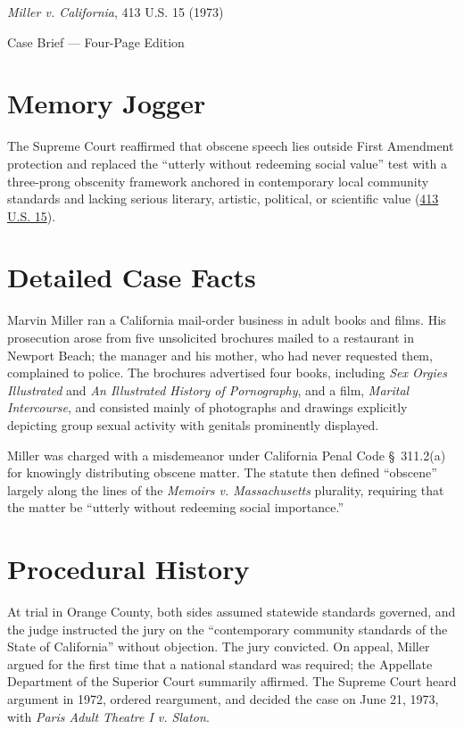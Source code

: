 \documentclass[12pt]{article}
\begin{document}
\begin{center}
{\LARGE \textit{Miller v. California}, 413 U.S. 15 (1973)\par}
\vspace{0.8em}
{\large Case Brief --- Four-Page Edition\par}
\end{center}
\vspace{1em}

\section{Memory Jogger}

The Supreme Court reaffirmed that obscene speech lies outside First Amendment protection and replaced the ``utterly without redeeming social value'' test with a three-prong obscenity framework anchored in contemporary local community standards and lacking serious literary, artistic, political, or scientific value (\href{https://supreme.justia.com/cases/federal/us/413/15/}{413 U.S. 15}).

\section{Detailed Case Facts}

Marvin Miller ran a California mail-order business in adult books and films. His prosecution arose from five unsolicited brochures mailed to a restaurant in Newport Beach; the manager and his mother, who had never requested them, complained to police. The brochures advertised four books, including \textit{Sex Orgies Illustrated} and \textit{An Illustrated History of Pornography}, and a film, \textit{Marital Intercourse}, and consisted mainly of photographs and drawings explicitly depicting group sexual activity with genitals prominently displayed.

Miller was charged with a misdemeanor under California Penal Code \S~311.2(a) for knowingly distributing obscene matter. The statute then defined ``obscene'' largely along the lines of the \textit{Memoirs v. Massachusetts} plurality, requiring that the matter be ``utterly without redeeming social importance.''

\section{Procedural History}

At trial in Orange County, both sides assumed statewide standards governed, and the judge instructed the jury on the ``contemporary community standards of the State of California'' without objection. The jury convicted. On appeal, Miller argued for the first time that a national standard was required; the Appellate Department of the Superior Court summarily affirmed. The Supreme Court heard argument in 1972, ordered reargument, and decided the case on June 21, 1973, with \textit{Paris Adult Theatre I v. Slaton}.
\end{document}
